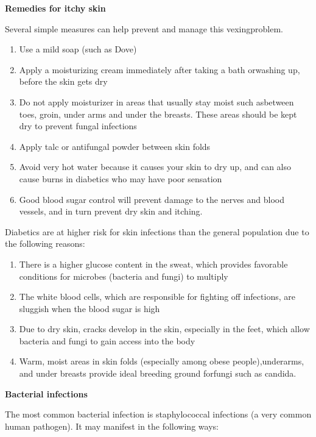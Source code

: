 \noindent\textbf{Remedies for itchy skin}

\noindent Several simple measures can help prevent and manage this vexing\break problem.

\begin{enumerate}[•]
\itemsep=0pt
\item Use a mild soap (such as Dove)
\item Apply a moisturizing cream immediately after taking a bath or\break washing up, before the skin gets dry
\item Do not apply moisturizer in areas that usually stay moist such as\break between toes, groin, under arms and under the breasts. These areas should be kept dry to prevent fungal infections
\item Apply talc or antifungal powder between skin folds
\item Avoid very hot water because it causes your skin to dry up, and can also cause burns in diabetics who may have poor sensation
\item Good blood sugar control will prevent damage to the nerves and blood vessels, and in turn prevent dry skin and itching.
\end{enumerate}


Diabetics are at higher risk for skin infections than the general popu\-lation due to the following reasons:

\begin{enumerate}[•]
\itemsep=0pt
\item There is a higher glucose content in the sweat, which provides favo\-rable conditions for microbes (bacteria and fungi) to multiply
\item The white blood cells, which are responsible for fighting off infe\-ctions, are sluggish when the blood sugar is high
\item Due to dry skin, cracks develop in the skin, especially in the feet, which allow bacteria and fungi to gain access into the body
\item Warm, moist areas in skin folds (especially among obese people),\break underarms, and under breasts provide ideal breeding ground for\break fungi such as candida.
\end{enumerate}

\noindent\textbf{Bacterial infections}

The most common bacterial infection is staphylococcal infections (a very common human pathogen). It may manifest in the following ways:

